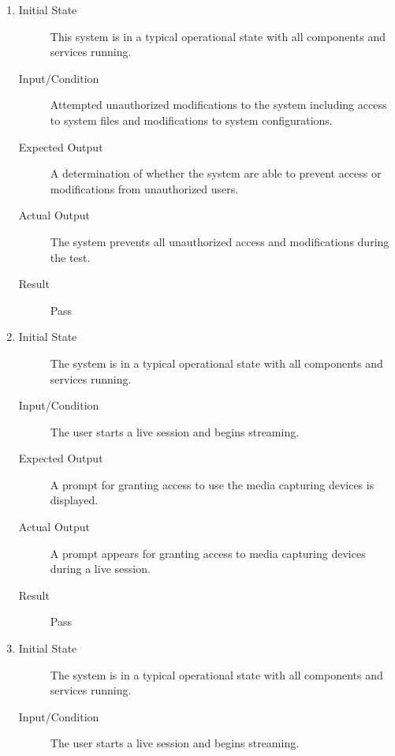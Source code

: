 \documentclass[12pt, titlepage]{article}
\begin{document}
\begin{enumerate}[NFR-T1]
  \item \label{NFRT23}
    \begin{description}
    \item[Initial State] This system is in a typical operational state with all
      components and services running.
    \item[Input/Condition] Attempted unauthorized modifications to the system
      including access to system files and modifications to system
      configurations.
    \item[Expected Output] A determination of whether the system are able to
      prevent access or modifications from unauthorized users.
    \item[Actual Output] The system prevents all unauthorized access and
      modifications during the test.
    \item[Result] Pass
    \end{description}
  \item \label{NFRT24}
    \begin{description}
    \item[Initial State] The system is in a typical operational state with all
      components and services running.
    \item[Input/Condition] The user starts a live session and begins streaming.
    \item[Expected Output] A prompt for granting access to use the media capturing
      devices is displayed.
    \item[Actual Output] A prompt appears for granting access to media capturing
      devices during a live session.
    \item[Result] Pass
    \end{description}
  \item \label{NFRT25}
    \begin{description}
    \item[Initial State] The system is in a typical operational state with all
      components and services running.
    \item[Input/Condition] The user starts a live session and begins streaming.

\end{description}
\end{enumerate}
\end{document}
